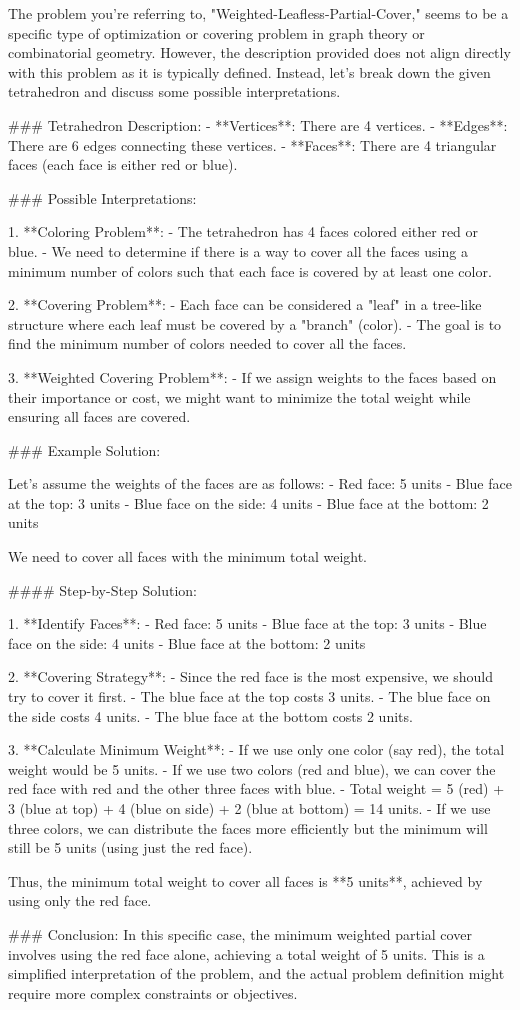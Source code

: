 The problem you're referring to, "Weighted-Leafless-Partial-Cover," seems to be a specific type of optimization or covering problem in graph theory or combinatorial geometry. However, the description provided does not align directly with this problem as it is typically defined. Instead, let's break down the given tetrahedron and discuss some possible interpretations.

### Tetrahedron Description:
- **Vertices**: There are 4 vertices.
- **Edges**: There are 6 edges connecting these vertices.
- **Faces**: There are 4 triangular faces (each face is either red or blue).

### Possible Interpretations:

1. **Coloring Problem**:
   - The tetrahedron has 4 faces colored either red or blue.
   - We need to determine if there is a way to cover all the faces using a minimum number of colors such that each face is covered by at least one color.

2. **Covering Problem**:
   - Each face can be considered a "leaf" in a tree-like structure where each leaf must be covered by a "branch" (color).
   - The goal is to find the minimum number of colors needed to cover all the faces.

3. **Weighted Covering Problem**:
   - If we assign weights to the faces based on their importance or cost, we might want to minimize the total weight while ensuring all faces are covered.

### Example Solution:

Let's assume the weights of the faces are as follows:
- Red face: 5 units
- Blue face at the top: 3 units
- Blue face on the side: 4 units
- Blue face at the bottom: 2 units

We need to cover all faces with the minimum total weight.

#### Step-by-Step Solution:

1. **Identify Faces**:
   - Red face: 5 units
   - Blue face at the top: 3 units
   - Blue face on the side: 4 units
   - Blue face at the bottom: 2 units

2. **Covering Strategy**:
   - Since the red face is the most expensive, we should try to cover it first.
   - The blue face at the top costs 3 units.
   - The blue face on the side costs 4 units.
   - The blue face at the bottom costs 2 units.

3. **Calculate Minimum Weight**:
   - If we use only one color (say red), the total weight would be 5 units.
   - If we use two colors (red and blue), we can cover the red face with red and the other three faces with blue.
     - Total weight = 5 (red) + 3 (blue at top) + 4 (blue on side) + 2 (blue at bottom) = 14 units.
   - If we use three colors, we can distribute the faces more efficiently but the minimum will still be 5 units (using just the red face).

Thus, the minimum total weight to cover all faces is **5 units**, achieved by using only the red face.

### Conclusion:
In this specific case, the minimum weighted partial cover involves using the red face alone, achieving a total weight of 5 units. This is a simplified interpretation of the problem, and the actual problem definition might require more complex constraints or objectives.